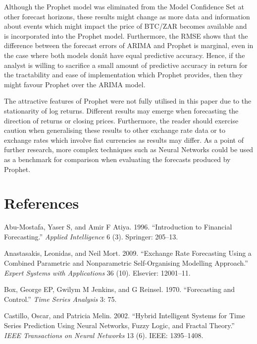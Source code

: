 \documentclass[12pt,a4paper]{article}
\numberwithin{equation}{section}
\numberwithin{figure}{section}
\numberwithin{table}{section}
\begin{document}
Although the Prophet model was eliminated from the Model Confidence Set
at other forecast horizons, these results might change as more data and
information about events which might impact the price of BTC/ZAR becomes
available and is incorporated into the Prophet model. Furthermore, the
RMSE shows that the difference between the forecast errors of ARIMA and
Prophet is marginal, even in the case where both models donât have
equal predictive accuracy. Hence, if the analyst is willing to sacrifice
a small amount of predictive accuracy in return for the tractability and
ease of implementation which Prophet provides, then they might favour
Prophet over the ARIMA model.

The attractive features of Prophet were not fully utilised in this paper
due to the stationarity of log returns. Different results may emerge
when forecasting the direction of returns or closing prices.
Furthermore, the reader should exercise caution when generalising these
results to other exchange rate data or to exchange rates which involve
fiat currencies as results may differ. As a point of further research,
more complex techniques such as Neural Networks could be used as a
benchmark for comparison when evaluating the forecasts produced by
Prophet.

\newpage

\section*{References}\label{references}

\hypertarget{refs}{}
\hypertarget{ref-abu1996}{}
Abu-Mostafa, Yaser S, and Amir F Atiya. 1996. ``Introduction to
Financial Forecasting.'' \emph{Applied Intelligence} 6 (3). Springer:
205--13.

\hypertarget{ref-anastasakis2009}{}
Anastasakis, Leonidas, and Neil Mort. 2009. ``Exchange Rate Forecasting
Using a Combined Parametric and Nonparametric Self-Organising Modelling
Approach.'' \emph{Expert Systems with Applications} 36 (10). Elsevier:
12001--11.

\hypertarget{ref-box1970}{}
Box, George EP, Gwilym M Jenkins, and G Reinsel. 1970. ``Forecasting and
Control.'' \emph{Time Series Analysis} 3: 75.

\hypertarget{ref-castillo2002}{}
Castillo, Oscar, and Patricia Melin. 2002. ``Hybrid Intelligent Systems
for Time Series Prediction Using Neural Networks, Fuzzy Logic, and
Fractal Theory.'' \emph{IEEE Transactions on Neural Networks} 13 (6).
IEEE: 1395--1408.
\end{document}
